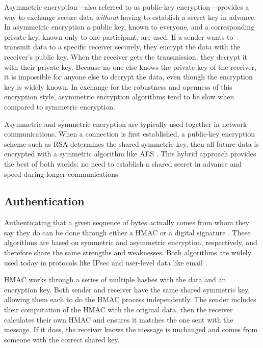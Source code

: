 \par Asymmetric encryption---also referred to as public-key encryption---provides a way to exchange secure data \textit{without} having to establish a secret key in advance. In asymmetric encryption a public key, known to everyone, and a corresponding private key, known only to one participant, are used. If a sender wants to transmit data to a specific receiver securely, they encrypt the data with the receiver's public key. When the receiver gets the transmission, they decrypt it with their private key. Because no one else knows the private key of the receiver, it is impossible for anyone else to decrypt the data, even though the encryption key is widely known. In exchange for the robustness and openness of this encryption style, asymmetric encryption algorithms tend to be slow when compared to symmetric encryption.

\par Asymmetric and symmetric encryption are typically used together in network communications. When a connection is first established, a public-key encryption scheme such as \ac{RSA} determines the shared symmetric key, then all future data is encrypted with a symmetric algorithm like \ac{AES} \cite{HybridEncryption}. This hybrid approach provides the best of both worlds: no need to establish a shared secret in advance and speed during longer communications.

\subsection{Authentication}
\label{sec:authentication}
\par Authenticating that a given sequence of bytes actually comes from whom they say they do can be done through either a \ac{HMAC} \cite{rfc2104} or a digital signature \cite{rfc3447}. These algorithms are based on symmetric and asymmetric encryption, respectively, and therefore share the same strengths and weaknesses. Both algorithms are widely used today in protocols like \ac{IPsec} \cite{rfc2404} and user-level data like email \cite{rfc5751}.

\par \ac{HMAC} works through a series of multiple hashes with the data and an encryption key. Both sender and receiver have the same shared symmetric key, allowing them each to do the \ac{HMAC} process independently. The sender includes their computation of the \ac{HMAC} with the original data, then the receiver calculates their own HMAC and ensures it matches the one sent with the message. If it does, the receiver knows the message is unchanged and comes from someone with the correct shared key.

